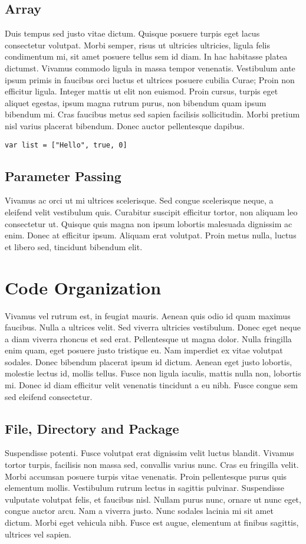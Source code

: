 \subsection{Array}
Duis tempus sed justo vitae dictum. Quisque posuere turpis eget lacus consectetur volutpat. Morbi semper, risus ut ultricies ultricies, ligula felis condimentum mi, sit amet posuere tellus sem id diam. In hac habitasse platea dictumst. Vivamus commodo ligula in massa tempor venenatis. Vestibulum ante ipsum primis in faucibus orci luctus et ultrices posuere cubilia Curae; Proin non efficitur ligula. Integer mattis ut elit non euismod. Proin cursus, turpis eget aliquet egestas, ipsum magna rutrum purus, non bibendum quam ipsum bibendum mi. Cras faucibus metus sed sapien facilisis sollicitudin. Morbi pretium nisl varius placerat bibendum. Donec auctor pellentesque dapibus.
\begin{lstlisting}[language=Lucy]
  var list = ["Hello", true, 0]
\end{lstlisting}

\subsection{Parameter Passing}
Vivamus ac orci ut mi ultrices scelerisque. Sed congue scelerisque neque, a eleifend velit vestibulum quis. Curabitur suscipit efficitur tortor, non aliquam leo consectetur ut. Quisque quis magna non ipsum lobortis malesuada dignissim ac enim. Donec at efficitur ipsum. Aliquam erat volutpat. Proin metus nulla, luctus et libero sed, tincidunt bibendum elit.


\section{Code Organization}
Vivamus vel rutrum est, in feugiat mauris. Aenean quis odio id quam maximus faucibus. Nulla a ultrices velit. Sed viverra ultricies vestibulum. Donec eget neque a diam viverra rhoncus et sed erat. Pellentesque ut magna dolor. Nulla fringilla enim quam, eget posuere justo tristique eu. Nam imperdiet ex vitae volutpat sodales. Donec bibendum placerat ipsum id dictum. Aenean eget justo lobortis, molestie lectus id, mollis tellus. Fusce non ligula iaculis, mattis nulla non, lobortis mi. Donec id diam efficitur velit venenatis tincidunt a eu nibh. Fusce congue sem sed eleifend consectetur.

\subsection{File, Directory and Package}
Suspendisse potenti. Fusce volutpat erat dignissim velit luctus blandit. Vivamus tortor turpis, facilisis non massa sed, convallis varius nunc. Cras eu fringilla velit. Morbi accumsan posuere turpis vitae venenatis. Proin pellentesque purus quis elementum mollis. Vestibulum rutrum lectus in sagittis pulvinar. Suspendisse vulputate volutpat felis, et faucibus nisl. Nullam purus nunc, ornare ut nunc eget, congue auctor arcu. Nam a viverra justo. Nunc sodales lacinia mi sit amet dictum. Morbi eget vehicula nibh. Fusce est augue, elementum at finibus sagittis, ultrices vel sapien.


